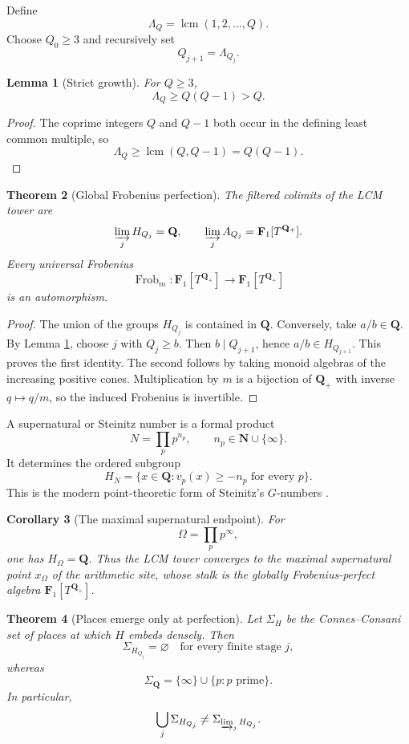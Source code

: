 \documentclass[11pt]{amsart}
\numberwithin{equation}{section}
\newtheorem{theorem}{Theorem}[section]
\newtheorem{corollary}[theorem]{Corollary}
\newtheorem{lemma}[theorem]{Lemma}
\theoremstyle{definition}
\newcommand{\Q}{\mathbf Q}
\newcommand{\N}{\mathbf N}
\newcommand{\Fone}{\mathbf F_1}
\begin{document}
Define
\[
\Lambda_Q=\operatorname{lcm}(1,2,\dots,Q).
\]
Choose $Q_0\geq3$ and recursively set
\[
Q_{j+1}=\Lambda_{Q_j}.
\]

\begin{lemma}[Strict growth]
\label{lem:lcm-growth}
For $Q\geq3$,
\[
\Lambda_Q\geq Q(Q-1)>Q.
\]
\end{lemma}

\begin{proof}
The coprime integers $Q$ and $Q-1$ both occur in the defining least common
multiple, so
\[
\Lambda_Q\geq\operatorname{lcm}(Q,Q-1)=Q(Q-1).
\]
\end{proof}

\begin{theorem}[Global Frobenius perfection]
\label{thm:global-perfection}
The filtered colimits of the LCM tower are
\[
\varinjlim_jH_{Q_j}=\Q,
\qquad
\varinjlim_jA_{Q_j}=\Fone[T^{\Q_+}].
\]
Every universal Frobenius
\[
\operatorname{Frob}_m:\Fone[T^{\Q_+}]
\longrightarrow\Fone[T^{\Q_+}]
\]
is an automorphism.
\end{theorem}

\begin{proof}
The union of the groups $H_{Q_j}$ is contained in $\Q$.  Conversely, take
$a/b\in\Q$.  By Lemma \ref{lem:lcm-growth}, choose $j$ with $Q_j\geq b$.
Then $b\mid Q_{j+1}$, hence $a/b\in H_{Q_{j+1}}$.  This proves the first
identity.  The second follows by taking monoid algebras of the increasing
positive cones.  Multiplication by $m$ is a bijection of $\Q_+$ with
inverse $q\mapsto q/m$, so the induced Frobenius is invertible.
\end{proof}

A supernatural or Steinitz number is a formal product
\[
N=\prod_p p^{n_p},
\qquad
n_p\in\N\cup\{\infty\}.
\]
It determines the ordered subgroup
\[
H_N=
\{x\in\Q:v_p(x)\geq-n_p\text{ for every }p\}.
\]
This is the modern point-theoretic form of Steinitz's $G$-numbers
\cite{Steinitz}.

\begin{corollary}[The maximal supernatural endpoint]
\label{cor:maximal-supernatural}
For
\[
\Omega=\prod_p p^\infty,
\]
one has $H_\Omega=\Q$.  Thus the LCM tower converges to the maximal
supernatural point $x_\Omega$ of the arithmetic site, whose stalk is the
globally Frobenius-perfect algebra $\Fone[T^{\Q_+}]$.
\end{corollary}

\begin{theorem}[Places emerge only at perfection]
\label{thm:places-emerge}
Let $\Sigma_H$ be the Connes--Consani set of places at which $H$ embeds
densely.  Then
\[
\Sigma_{H_{Q_j}}=\varnothing
\quad\text{for every finite stage }j,
\]
whereas
\[
\Sigma_{\Q}=\{\infty\}\cup\{p:p\text{ prime}\}.
\]
In particular,
\[
\bigcup_j\Sigma_{H_{Q_j}}
\neq
\Sigma_{\varinjlim_jH_{Q_j}}.
\]
\end{theorem}
\end{document}
